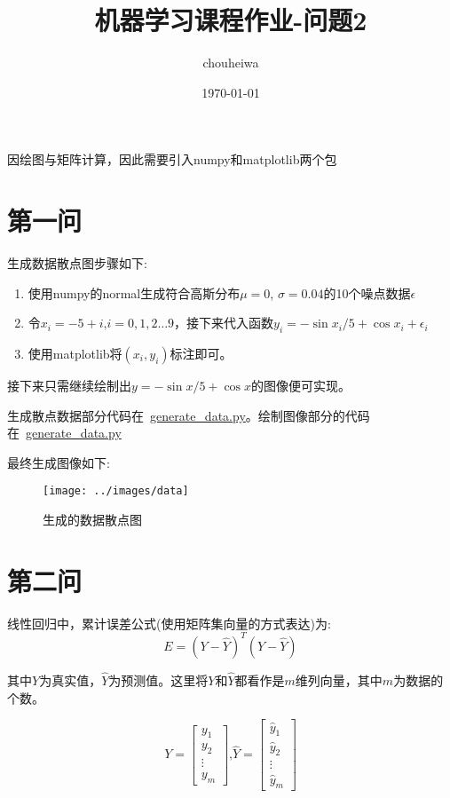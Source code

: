 \documentclass[UTF8]{article} %
\title{机器学习课程作业-问题2}
\author{chouheiwa}
\date{\today}
\begin{document}
    \maketitle
    \tableofcontents
    因绘图与矩阵计算，因此需要引入numpy和matplotlib两个包


    \section{第一问}
    生成数据散点图步骤如下:
    \begin{enumerate}
        \item 使用numpy的normal生成符合高斯分布$\mu = 0$, $\sigma = 0.04$的10个噪点数据$\epsilon$
        \item 令$x_i = -5 + i\text{,} i = 0, 1, 2 \dots 9$，接下来代入函数$y_i = -\sin{x_i / 5} + \cos{x_i} + \epsilon_i$
        \item 使用matplotlib将$(x_i, y_i)$标注即可。
    \end{enumerate}

    接下来只需继续绘制出$y = -\sin{x / 5} + \cos{x}$的图像便可实现。

    生成散点数据部分代码在~\href{run:generate_data.py}{generate\_data.py}。绘制图像部分的代码在~\href{run:generate_data.py}{generate\_data.py}

    最终生成图像如下:

    \begin{figure}[H]
        \centering
        \texttt{[image: ../images/data]}
        \caption{生成的数据散点图}
        \label{fig:data}
    \end{figure}


    \section{第二问}
    线性回归中，累计误差公式(使用矩阵集向量的方式表达)为:
    \begin{equation}
        E = (Y - \hat{Y})^T(Y - \hat{Y})
        \label{eq:E}
    \end{equation}

    其中$Y$为真实值，$\hat{Y}$为预测值。这里将$Y$和$\hat{Y}$都看作是$m$维列向量，其中$m$为数据的个数。

    \begin{equation}
        Y = \begin{bmatrix}
                y_1    \\
                y_2    \\
                \vdots \\
                y_m
        \end{bmatrix} \text{,}
        \hat{Y} = \begin{bmatrix}
                      \hat{y}_1 \\
                      \hat{y}_2 \\
                      \vdots    \\
                      \hat{y}_m
        \end{bmatrix}\label{eq:Y}
    \end{equation}
\end{document}
